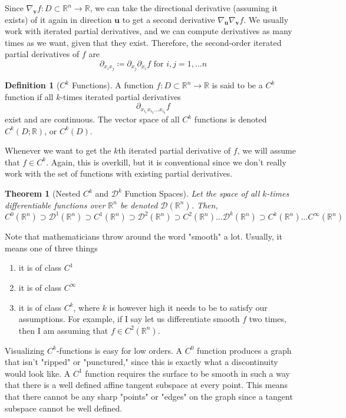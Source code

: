 \documentclass{article}
\newtheorem{theorem}{Theorem}[section]
\theoremstyle{remark}
\theoremstyle{definition}
\newtheorem{definition}{Definition}[section]
\begin{document}
Since $\nabla_\mathbf{v} f: D \subset \mathbb{R}^n \longrightarrow \mathbb{R}$, we can take the directional derivative (assuming it exists) of it again in direction $\mathbf{u}$ to get a second derivative $\nabla_\mathbf{u} \nabla_\mathbf{v} f$. We usually work with iterated partial derivatives, and we can compute derivatives as many times as we want, given that they exist. Therefore, the second-order iterated partial derivatives of $f$ are 
\[\partial_{x_i x_j} \coloneqq \partial_{x_j} \partial_{x_i} f \text{ for } i, j = 1, \ldots n\]

\begin{definition}[$C^k$ Functions]
A function $f: D \subset \mathbb{R}^n \longrightarrow \mathbb{R}$ is said to be a $C^k$ function if all $k$-times iterated partial derivatives 
\[\partial_{x_{i_1} x_{i_2} \ldots x_{i_k}} f\]
exist and are continuous. The vector space of all $C^k$ functions is denoted $C^k (D; \mathbb{R})$, or $C^k(D)$. 
\end{definition}

Whenever we want to get the $k$th iterated partial derivative of $f$, we will assume that $f \in C^k$. Again, this is overkill, but it is conventional since we don't really work with the set of functions with existing partial derivatives. 

\begin{theorem}[Nested $C^k$ and $\mathcal{D}^k$ Function Spaces]
Let the space of all $k$-times differentiable functions over $\mathbb{R}^n$ be denoted $\mathcal{D}(\mathbb{R}^n)$. Then, 
\[C^0(\mathbb{R}^n) \supset \mathcal{D}^1 (\mathbb{R}^n) \supset C^1 (\mathbb{R}^n) \supset \mathcal{D}^2 (\mathbb{R}^n) \supset C^2 (\mathbb{R}^n) \ldots \mathcal{D}^k (\mathbb{R}^n) \supset C^k (\mathbb{R}^n) \ldots C^\infty (\mathbb{R}^n) \]
\end{theorem}

Note that mathematicians throw around the word "smooth" a lot. Usually, it means one of three things
\begin{enumerate}
    \item it is of class $C^1$ 
    \item it is of class $C^\infty$
    \item it is of class $C^k$, where $k$ is however high it needs to be to satisfy our assumptions. For example, if I say let us differentiate smooth $f$ two times, then I am assuming that $f \in C^2 (\mathbb{R}^n)$. 
\end{enumerate}
Visualizing $C^k$-functions is easy for low orders. A $C^0$ function produces a graph that isn't "ripped" or "punctured," since this is exactly what a discontinuity would look like. A $C^1$ function requires the surface to be smooth in such a way that there is a well defined affine tangent subspace at every point. This means that there cannot be any sharp "points" or "edges" on the graph since a tangent subspace cannot be well defined. 
\end{document}
